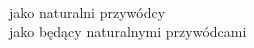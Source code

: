 \documentclass[a4paper,11pt]{article}
\begin{document}
\noindent
{} \\
\Jest  jako naturalni przywódcy \\
\Powin jako będący naturalnymi przywódcami \\





\end{document}
